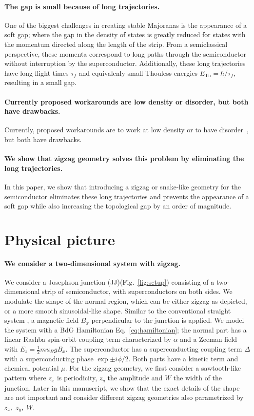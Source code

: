 \documentclass[english, twocolumn, 10pt, aps, superscriptaddress, floatfix, prb, citeautoscript]{revtex4-1}
\renewcommand{\comment}[2]{#2}
\renewcommand{\comment}{\paragraph}
\begin{document}
\comment{The gap is small because of long trajectories.}
One of the biggest challenges in creating stable Majoranas is the appearance of a soft gap; where the gap in the density of states is greatly reduced for states with the momentum directed along the length of the strip.
From a semiclassical perspective, these momenta correspond to long paths through the semiconductor without interruption by the superconductor.
Additionally, these long trajectories have long flight times $\tau_f$ and equivalenly small Thouless energies $E_{\textrm{Th}}=\hbar / \tau_f$, resulting in a small gap. 

\comment{Currently proposed workarounds are low density or disorder, but both have drawbacks.}
Currently, proposed workarounds are to work at low density \cite{nijholt2015orbital} or to have disorder~\cite{haim_double-edge_2018}, but both have drawbacks.

\comment{We show that zigzag geometry solves this problem by eliminating the long trajectories.}
In this paper, we show that introducing a zigzag or snake-like geometry for the semiconductor eliminates these long trajectories and prevents the appearance of a soft gap while also increasing the topological gap by an order of magnitude.


\section{Physical picture}
\comment{We consider a two-dimensional system with zigzag.}
We consider a Josephson junction (JJ)(Fig.~\ref{fig:setup}) consisting of a two-dimensional strip of semiconductor, with superconductors on both sides.
We modulate the shape of the normal region, which can be either zigzag as depicted, or a more smooth sinusoidal-like shape.
Similar to the conventional straight system \cite{pientka2017topological}, a magnetic field $B_x$ perpendicular to the junction is applied.
We model the system with a BdG Hamiltonian Eq.~\eqref{eq:hamiltonian}; the normal part has a linear Rashba spin-orbit coupling term characterized by $\alpha$ and a Zeeman field with $E_z=\frac{1}{2}mu_B g B_x$.
The superconductor has a superconducting coupling term $\Delta$ with a superconducting phase $\exp{\pm i \phi/2}$.
Both parts have a kinetic term and chemical potential $\mu$. 
For the zigzag geometry, we first consider a sawtooth-like pattern where $z_x$ is periodicity, $z_y$ the amplitude and $W$ the width of the junction.
Later in this manuscript, we show that the exact details of the shape are not important and consider different zigzag geometries also parametrized by $z_x, \; z_y, \; W$.
\end{document}
